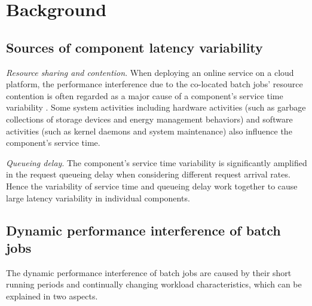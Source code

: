 \documentclass[10pt, conference, compsocconf]{IEEEtran}
\begin{document}
\section{Background} \label{Section: Background}
\subsection{Sources of component latency variability} \label{Section:Sources of tail latency}

\emph{Resource sharing and contention}. When deploying an online service on a cloud platform, the performance interference due to the co-located batch jobs' resource contention is often regarded as a major cause of a component's service time variability \cite{tailatScale,leverich2014reconciling}. Some system activities including hardware activities (such as garbage collections of storage devices and energy management behaviors) and software activities (such as kernel daemons and system maintenance) also influence the component's service time.

\emph{Queueing delay}. The component's service time variability is significantly amplified in the request queueing delay when considering different request arrival rates. Hence the variability of service time and queueing delay work together to cause large latency variability in individual components.

























\subsection{Dynamic performance interference of batch jobs} \label{Section:Managing data center applications}




The dynamic performance interference of batch jobs are caused by their short running periods and continually changing workload characteristics, which can be explained in two aspects.
\end{document}
